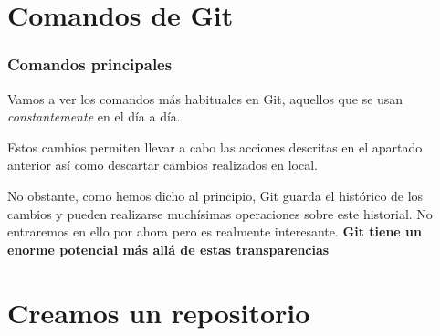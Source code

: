 \documentclass[10pt,compress,usetitleprogressbar,aspectratio=1610,mathserif,notes]{beamer}
\begin{document}
\section{Comandos de Git}
\begin{frame}
\frametitle{Comandos principales}
Vamos a ver los comandos más habituales en Git, aquellos que se usan \textit{constantemente} en el día a día.

Estos cambios permiten llevar a cabo las acciones descritas en el apartado anterior así como descartar cambios realizados en local.

No obstante, como hemos dicho al principio, Git guarda el histórico de los cambios y pueden realizarse muchísimas operaciones sobre este historial. No entraremos en ello por ahora pero es realmente interesante. \textbf{Git tiene un enorme potencial más allá de estas transparencias}
\end{frame}

\section{Creamos un repositorio}
\end{document}
